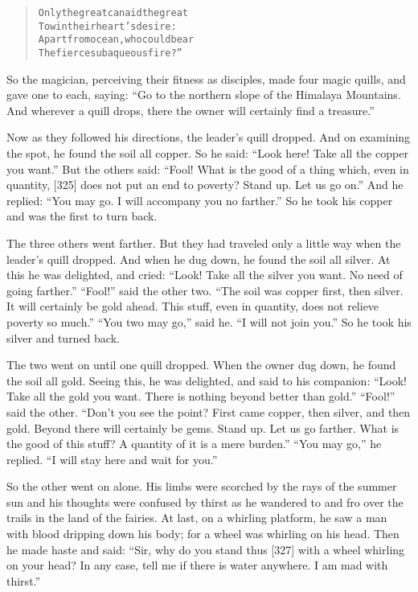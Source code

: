 \documentclass[article, twoside, 14pt]{memoir}
\renewenvironment{verbatim}{%
\begin{quote}%
\vskip -10pt%
\begin{alltt}\normalfont\large}{\end{alltt}%
\end{quote}%
\vskip -10pt
} %
\begin{document}
\begin{verbatim}
Only the great can aid the great
    To win their heart's desire:
Apart from ocean, who could bear
    The fierce subaqueous fire?”
\end{verbatim}
So the magician, perceiving their fitness as disciples, made four
magic quills, and gave one to each, saying:
``Go to the northern slope of the Himalaya Mountains. And wherever a quill drops, there the owner will certainly find a treasure.''

Now as they followed his directions, the leader's quill dropped.
And on examining the spot, he found the soil all copper. So he
said: ``Look here! Take all the copper you want.'' But the others
said:
``Fool! What is the good of a thing which, even in quantity, [325] does not put an end to poverty? Stand up. Let us go on.''
And he replied: ``You may go. I will accompany you no farther.'' So
he took his copper and was the first to turn back.

The three others went farther. But they had traveled only a little
way when the leader's quill dropped. And when he dug down, he found
the soil all silver. At this he was delighted, and cried:
``Look! Take all the silver you want. No need of going farther.''
``Fool!'' said the other two.
``The soil was copper first, then silver. It will certainly be gold ahead. This stuff, even in quantity, does not relieve poverty so much.''
``You two may go,'' said he. ``I will not join you.'' So he took
his silver and turned back.

The two went on until one quill dropped. When the owner dug down,
he found the soil all gold. Seeing this, he was delighted, and said
to his companion:
``Look! Take all the gold you want. There is nothing beyond better than gold.''
``Fool!'' said the other.
``Don't you see the point? First came copper, then silver, and then gold. Beyond there will certainly be gems. Stand up. Let us go farther. What is the good of this stuff? A quantity of it is a mere burden.''
``You may go,'' he replied. ``I will stay here and wait for you.''

So the other went on alone. His limbs were scorched by the rays of
the summer sun and his thoughts were confused by thirst as he
wandered to and fro over the trails in the land of the fairies. At
last, on a whirling platform, he saw a man with blood dripping down
his body; for a wheel was whirling on his head. Then he made haste
and said:
``Sir, why do you stand thus [327] with a wheel whirling on your head? In any case, tell me if there is water anywhere. I am mad with thirst.''
\end{document}
